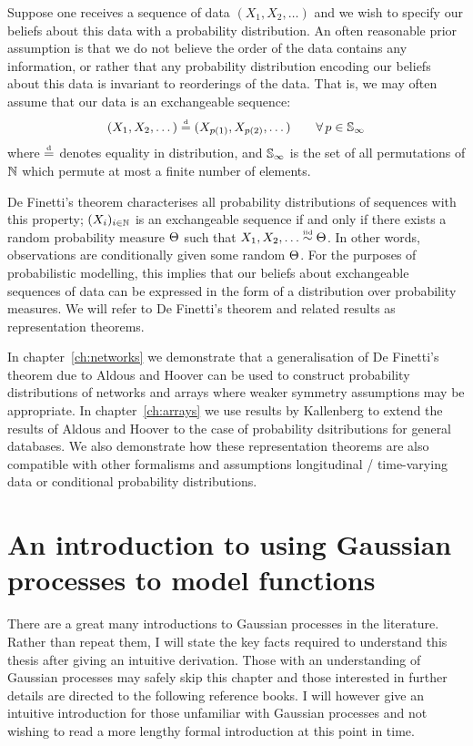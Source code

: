 Suppose one receives a sequence of data $(X_1, X_2, \dots)$ and we wish to specify our beliefs about this data with a probability distribution.
An often reasonable prior assumption is that we do not believe the order of the data contains any information, or rather that any probability distribution encoding our beliefs about this data is invariant to reorderings of the data.
That is, we may often assume that our data is an exchangeable sequence:
\[
  \label{eq:intro:exch}
  (X_1, X_2, \dots) \stackrel{\mbox{\tiny d}}{=} (X_{p(1)}, X_{p(2)}, \dots) \qquad \forall\, p\in\mathbb{S}_{\infty}
\]
where $\stackrel{\mbox{\tiny d}}{=}$ denotes equality in distribution, and $\mathbb{S}_{\infty}$ is the set of all permutations of $\mathbb{N}$ which permute at most a finite number of elements.

De Finetti's theorem \citep[e.g.][]{Kallenberg:2005} characterises all probability distributions of sequences with this property;  $(X_i)_{i\in\mathbb{N}}$ is an exchangeable sequence if and only if there exists a random probability measure $\Theta$ such that $X_1,X_2,\ldots\overset{\mbox{\tiny iid}}{\sim}\Theta$.
In other words, observations are conditionally \iid given some random $\Theta$.
For the purposes of probabilistic modelling, this implies that our beliefs about exchangeable sequences of data can be expressed in the form of a distribution over probability measures.
We will refer to De Finetti's theorem and related results as representation theorems. 

In chapter~\ref{ch:networks} we demonstrate that a generalisation of De Finetti's theorem due to Aldous and Hoover can be used to construct probability distributions of networks and arrays where weaker symmetry assumptions may be appropriate.
In chapter~\ref{ch:arrays} we use results by Kallenberg to extend the results of Aldous and Hoover to the case of probability dsitributions for general databases.
We also demonstrate how these representation theorems are also compatible with other formalisms and assumptions \eg longitudinal / time-varying data or conditional probability distributions.

\section{An introduction to using Gaussian processes to model functions}

There are a great many introductions to Gaussian processes in the literature.
Rather than repeat them, I will state the key facts required to understand this thesis after giving an intuitive derivation.
Those with an understanding of Gaussian processes may safely skip this chapter and those interested in further details are directed to the following reference books.
I will however give an intuitive introduction for those unfamiliar with Gaussian processes and not wishing to read a more lengthy formal introduction at this point in time.

